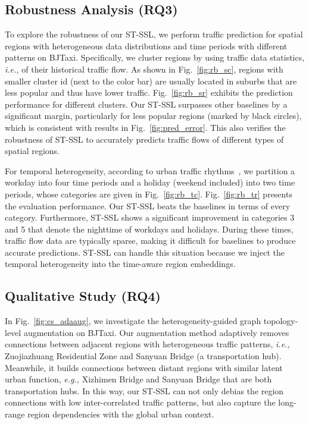 \documentclass[letterpaper]{article} \usepackage{aaai23}  \usepackage{times}  \usepackage{helvet}  \usepackage{courier}  \usepackage[hyphens]{url}  \usepackage{graphicx} \urlstyle{rm} \def\UrlFont{\rm}  \usepackage{natbib}  \usepackage{caption} \frenchspacing  \setlength{\pdfpagewidth}{8.5in} \setlength{\pdfpageheight}{11in}
\newcommand{\ie}{\emph{i.e.,}\xspace}
\newcommand{\eg}{\emph{e.g.,}\xspace}
\newcommand{\name}{ST-SSL\xspace}
\newcommand{\figureautorefname}{Fig.}
\begin{document}
\subsection{Robustness Analysis (RQ3)}

To explore the robustness of our \name, we perform traffic prediction for spatial regions with heterogeneous data distributions and time periods with different patterns on BJTaxi. Specifically, we cluster regions by using traffic data statistics, \ie  of their historical traffic flow. As shown in \figureautorefname{~\ref{fig:rb_sc}}, regions with smaller cluster id (next to the color bar) are usually located in suburbs that are less popular and thus have lower traffic. \figureautorefname{~\ref{fig:rb_sr}} exhibits the prediction performance for different clusters. Our \name surpasses other baselines by a significant margin, particularly for less popular regions (marked by black circles), which is consistent with results in \figureautorefname{~\ref{fig:pred_error}}. This also verifies the robustness of \name to accurately predicts traffic flows of different types of spatial regions.

For temporal heterogeneity, according to urban traffic rhythms~\cite{wang2019understanding}, we partition a workday into four time periods and a holiday (weekend included) into two time periods, whose categories are given in \figureautorefname{~\ref{fig:rb_tc}}. \figureautorefname{~\ref{fig:rb_tr}} presents the evaluation performance. Our \name beats the baselines in terms of every category. Furthermore, \name shows a significant improvement in categories 3 and 5 that denote the nighttime of workdays and holidays. During these times, traffic flow data are typically sparse, making it difficult for baselines to produce accurate predictions. \name can handle this situation because we inject the temporal heterogeneity into the time-aware region embeddings.





\subsection{Qualitative Study (RQ4)} 

In \figureautorefname~\ref{fig:cs_adaaug}, we investigate the heterogeneity-guided graph topology-level augmentation on BJTaxi. Our augmentation method adaptively removes connections between adjacent regions with heterogeneous traffic patterns, \ie Zuojiazhuang Residential Zone and Sanyuan Bridge (a transportation hub). Meanwhile, it builds connections between distant regions with similar latent urban function, \eg Xizhimen Bridge and Sanyuan Bridge that are both transportation hubs. In this way, our \name can not only debias the region connections with low inter-correlated traffic patterns, but also capture the long-range region dependencies with the global urban context.  
\end{document}
